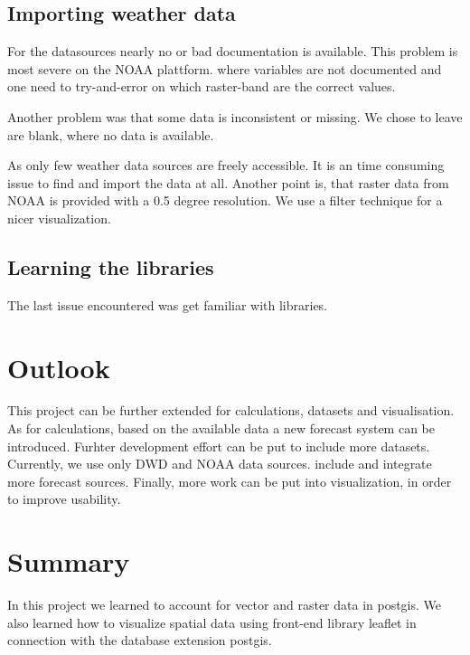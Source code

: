 \documentclass[english]{lni}
\begin{document}
\subsection{Importing weather data}
For the datasources nearly no or bad documentation is available. This problem is most severe on the NOAA plattform. where variables are not documented and one need to try-and-error on which raster-band are the correct values.

Another problem was that some data is inconsistent or missing. We chose to leave are blank, where no data is available.

As only few weather data sources are freely accessible. It is an time consuming issue to find and import the data at all.
Another point is, that raster data from NOAA is provided with a 0.5 degree resolution. We use a filter technique for a nicer visualization.

\subsection{Learning the libraries}

The last issue encountered was get familiar with libraries.

\section{Outlook}

This project can be further extended for calculations, datasets and visualisation.
As for calculations, based on the available data a new forecast system can be introduced. 
Furhter development effort can be put to include more datasets. Currently, we use only DWD and NOAA data sources. include and integrate more forecast sources.
Finally, more work can be put into visualization, in order to improve usability. 

\section{Summary}
In this project we learned to account for vector and raster data in postgis. We also learned how to visualize spatial data using front-end library leaflet in connection with the database extension postgis.


\end{document}
